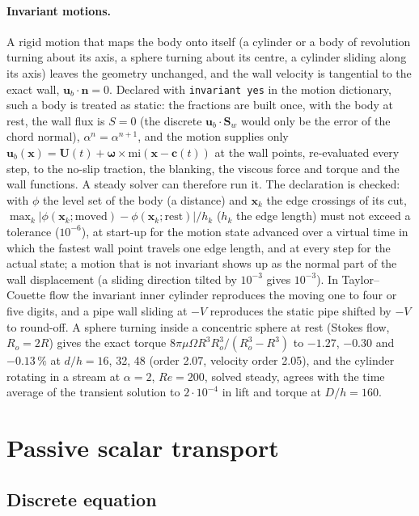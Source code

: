 \documentclass[11pt,a4paper]{article}
\theoremstyle{remark}
\newcommand{\uu}{\bm{u}}
\newcommand{\ub}{\uu_b}
\newcommand{\xx}{\bm{x}}
\newcommand{\code}[1]{\texttt{#1}}
\begin{document}
\paragraph{Invariant motions.} A rigid motion that maps the body onto itself (a cylinder or a
body of revolution turning about its axis, a sphere turning about its centre, a cylinder
sliding along its axis) leaves the geometry unchanged, and the wall velocity is tangential to
the exact wall, $\ub\cdot\bm n=0$. Declared with \code{invariant yes} in the motion
dictionary, such a body is treated as static: the fractions are built once, with the body at
rest, the wall flux is $S=0$ (the discrete $\ub\cdot\bm S_w$ would only be the error of the
chord normal), $\alpha^n=\alpha^{n+1}$, and the motion supplies only $\ub(\xx)=\bm U(t)+\bm\omega
\times\mathrm{mi}(\xx-\bm c(t))$ at the wall points, re-evaluated every step, to the no-slip
traction, the blanking, the viscous force and torque and the wall functions. A steady solver can
therefore run it. The declaration is checked: with $\phi$ the level set of the body (a
distance) and $\xx_k$ the edge crossings of its cut, $\max_k|\phi(\xx_k;\text{moved})-
\phi(\xx_k;\text{rest})|/h_k$ ($h_k$ the edge length) must not exceed a tolerance ($10^{-6}$),
at start-up for the motion state advanced over a virtual time in which the fastest wall point
travels one edge length, and at every step for the actual state; a motion that is not
invariant shows up as the normal part of the wall displacement (a sliding direction tilted by
$10^{-3}$ gives $10^{-3}$). In Taylor--Couette flow the invariant inner cylinder reproduces the
moving one to four or five digits, and a pipe wall sliding at $-V$ reproduces the static pipe
shifted by $-V$ to round-off. A sphere turning inside a concentric sphere at rest (Stokes flow,
$R_o=2R$) gives the exact torque $8\pi\mu\Omega R^3R_o^3/(R_o^3-R^3)$ to $-1.27$, $-0.30$ and
$-0.13\,\%$ at $d/h=16$, 32, 48 (order 2.07, velocity order 2.05), and the cylinder rotating in a
stream at $\alpha=2$, $Re=200$, solved steady, agrees with the time average of the transient
solution to $2\cdot10^{-4}$ in lift and torque at $D/h=160$.
\section{Passive scalar transport}
\label{sec:scalar}

\subsection{Discrete equation}
\end{document}
